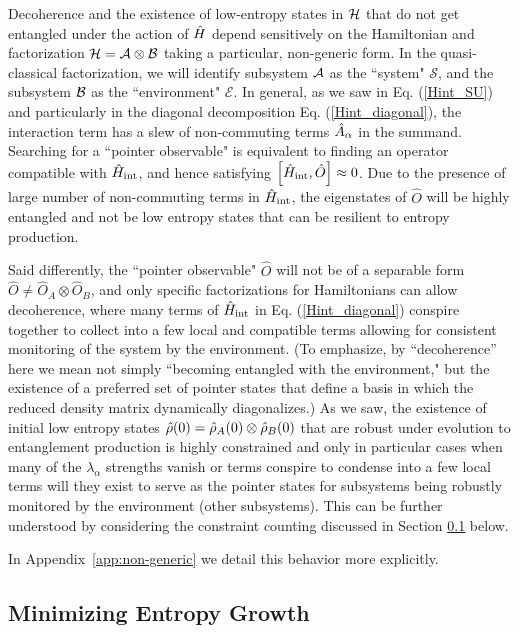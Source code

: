 \documentclass[aps,pra,onecolumn,nofootinbib,11pt,tightenlines]{revtex4-1}
\begin{document}
Decoherence and the existence of low-entropy states in $\mathcal{H}$ that do not get entangled under the action of $\hat{H}$ depend sensitively on the Hamiltonian and factorization  $\mathcal{H} = \mathcal{A} \otimes \mathcal{B}$ taking a particular, non-generic form. In the quasi-classical factorization, we will identify subsystem $\mathcal{A}$ as the ``system" $\mathcal{S}$, and the subsystem $\mathcal{B}$ as the ``environment" $\mathcal{E}$. In general, as we saw in Eq. (\ref{Hint_SU}) and particularly in the diagonal decomposition Eq. (\ref{Hint_diagonal}), the interaction term has a slew of non-commuting terms $\hat{A}_{\alpha}$ in the summand. Searching for a ``pointer observable" is equivalent to finding an operator compatible with $\hat{H}_{\rm{int}}$, and hence satisfying $\left[ \hat{H}_{\rm{int}}, \hat{O}\right] \approx 0$. Due to the presence of large number of non-commuting terms in $\hat{H}_{\rm{int}}$, the eigenstates of $\hat{O}$ will be highly entangled and not be low entropy states that can be resilient to entropy production. 

Said differently, the ``pointer observable" $\hat{O}$ will not be of a separable form $\hat{O} \neq \hat{O}_{A} \otimes \hat{O}_{B}$, and only specific factorizations for Hamiltonians can allow decoherence, where many terms of $\hat{H}_{\rm{int}}$ in Eq. (\ref{Hint_diagonal}) conspire together to collect into a  few local and compatible terms allowing for consistent monitoring of the system by the environment.
(To emphasize, by ``decoherence'' here we mean not simply ``becoming entangled with the environment," but the existence of a preferred set of pointer states that define a basis in which the reduced density matrix dynamically diagonalizes.)
As we saw, the existence of initial low entropy states $\hat{\rho}(0) = \hat{\rho}_{A}(0) \otimes \hat{\rho}_{B}(0)$ that are robust under evolution to entanglement production is highly constrained and only in particular cases when many of the $\lambda_{\alpha}$ strengths vanish or terms conspire to condense into a few local terms will they exist to serve as the pointer states for subsystems being robustly monitored by the environment (other subsystems). This can be further understood by considering the constraint counting discussed in Section \ref{subsec:min_entropy} below.

In Appendix~\ref{app:non-generic} we detail this behavior more explicitly.
 
 \subsection{Minimizing Entropy Growth}
\label{subsec:min_entropy}
\end{document}
